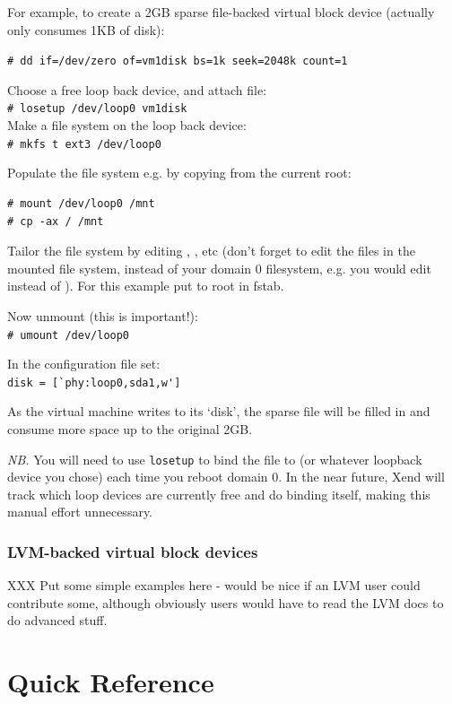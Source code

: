 \documentclass[11pt,twoside,final,openright]{xenstyle}
\begin{document}
For example, to create a 2GB sparse file-backed virtual block device
(actually only consumes 1KB of disk):

\verb_# dd if=/dev/zero of=vm1disk bs=1k seek=2048k count=1_

Choose a free loop back device, and attach file: \\
\verb_# losetup /dev/loop0 vm1disk_ \\
Make a file system on the loop back device: \\
\verb_# mkfs ­t ext3 /dev/loop0_

Populate the file system e.g. by copying from the current root:
\begin{verbatim}
# mount /dev/loop0 /mnt
# cp -ax / /mnt
\end{verbatim}
Tailor the file system by editing ,
, etc (don't forget to edit the files in the
mounted file system, instead of your domain 0 filesystem, e.g. you
would edit  instead of  ).  For
this example put  to root in fstab.

Now unmount (this is important!):\\
\verb_# umount /dev/loop0_

In the configuration file set:\\
\verb_disk = [`phy:loop0,sda1,w']_

As the virtual machine writes to its `disk', the sparse file will be
filled in and consume more space up to the original 2GB.

{\em NB.} You will need to use {\tt losetup} to bind the file to
 (or whatever loopback device you chose) each time
you reboot domain 0.  In the near future, Xend will track which loop
devices are currently free and do binding itself, making this manual
effort unnecessary.

\section{LVM-backed virtual block devices}

XXX Put some simple examples here - would be nice if an LVM user could
contribute some, although obviously users would have to read the LVM
docs to do advanced stuff.

\part{Quick Reference}
\end{document}
